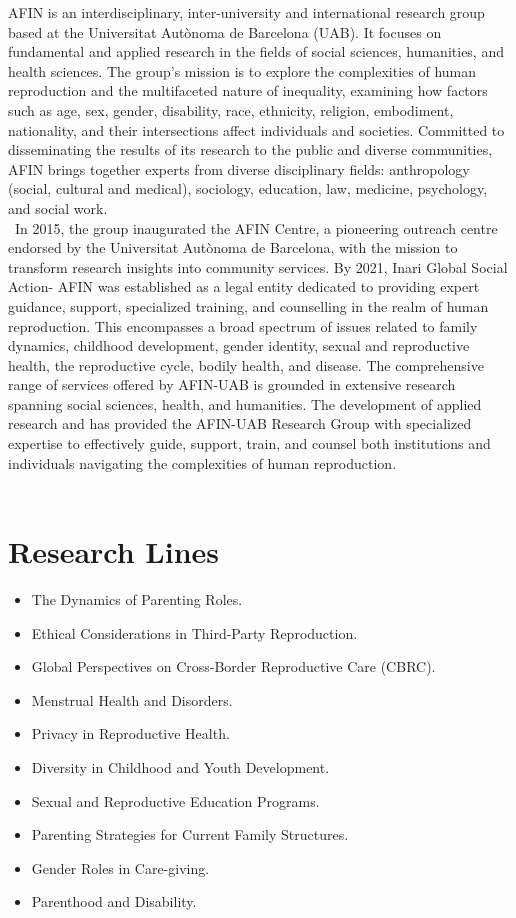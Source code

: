 \documentclass[english,a4paper,12pt,titlepage]{report}
\begin{document}
	AFIN is an interdisciplinary, inter-university and international research group based at the Universitat Autònoma de Barcelona (UAB). It focuses on fundamental and applied research in the fields of social sciences, humanities, and health sciences. The group's mission is to explore the complexities of human reproduction and the multifaceted nature of inequality, examining how factors such as age, sex, gender, disability, race, ethnicity, religion, embodiment, nationality, and their intersections affect individuals and societies. Committed to disseminating the results of its research to the public and diverse communities, AFIN brings together experts from diverse disciplinary fields: anthropology (social, cultural and medical), sociology, education, law, medicine, psychology, and social work.\\\
	In 2015, the group inaugurated the AFIN Centre, a pioneering outreach centre endorsed by the Universitat Autònoma de Barcelona, with the mission to transform research insights into community services. By 2021, Inari Global Social Action- AFIN was established as a legal entity dedicated to providing expert guidance, support, specialized training, and counselling in the realm of human reproduction. This encompasses a broad spectrum of issues related to family dynamics, childhood development, gender identity, sexual and reproductive health, the reproductive cycle, bodily health, and disease. The comprehensive range of services offered by AFIN-UAB is grounded in extensive research spanning social sciences, health, and humanities. The development of applied research and has provided the AFIN-UAB Research Group with specialized expertise to effectively guide, support, train, and counsel both institutions and individuals navigating the complexities of human reproduction.\\\
	

	
	\chapter{Research Lines}
	\begin{itemize}
		\item The Dynamics of Parenting Roles.
		\item Ethical Considerations in Third-Party Reproduction.
		\item Global Perspectives on Cross-Border Reproductive Care (CBRC).
		\item Menstrual Health and Disorders.
		\item Privacy in Reproductive Health.
		\item Diversity in Childhood and Youth Development. 
		\item Sexual and Reproductive Education Programs.
		\item Parenting Strategies for Current Family Structures.
		\item Gender Roles in Care-giving.
		\item Parenthood and Disability.  
	\end{itemize}
	
\end{document}
